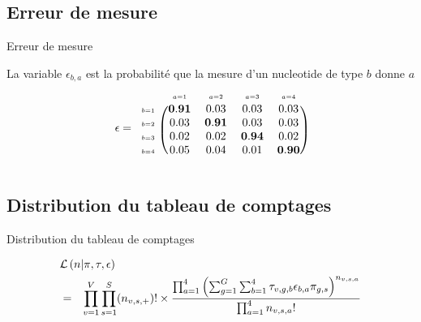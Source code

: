 \documentclass{beamer}
\newcommand{\fr}[1]{#1}
\newcommand{\en}[1]{}
\begin{document}
\subsection{\en{Measurement errors}\fr{Erreur de mesure}}
\begin{frame}{\en{Measurement errors}\fr{Erreur de mesure}}
\en{The variable $\epsilon_{b,a}$ is the probability that the measurment of a nucleotide of type $b$ reads $a$}
\fr{La variable $\epsilon_{b,a}$ est la probabilité que la mesure d'un nucleotide de type $b$ donne  $a$}
  $$\epsilon=\begin{blockarray}{ccccc}
    &\scriptscriptstyle a=1&\scriptscriptstyle a=2&\scriptscriptstyle a=3&\scriptscriptstyle a=4\\
    \begin{block}{c(cccc)}
 {\scriptscriptstyle b=1}&\mathbf{0.91}&0.03&0.03&0.03\\   
 {\scriptscriptstyle 
 b=2}&0.03&\mathbf{0.91}&0.03&0.03\\   
  {\scriptscriptstyle 
 b=3}&0.02&0.02&\mathbf{0.94}&0.02\\   
  {\scriptscriptstyle 
 b=4}&0.05&0.04&0.01&\mathbf{0.90}\\   
    \end{block}
\end{blockarray} $$


\end{frame}
\subsection{\fr{Distribution du tableau de comptages}\en{Distribution of the counts}}
\begin{frame}{\fr{Distribution du tableau de comptages}\en{Distribution of the counts}}
    
\begin{eqnarray*}\lefteqn{\mathcal{L}\left(n | \pi, \tau,\epsilon \right)}\nonumber\\& =& \prod_{v=1}^{V} \prod_{s = 1}^{S} (n_{v,s,+})!\times\frac{\prod_{a = 1}^{4} \left( \sum_{g = 1}^{G}\sum_{b=1}^{4} \tau_{v,g,b}\epsilon_{b,a} \pi_{g,s}  \right)^{n_{v,s,a}}}{\prod_{a = 1}^{4}n_{v,s,a}!}\end{eqnarray*}
\end{frame}
\end{document}
